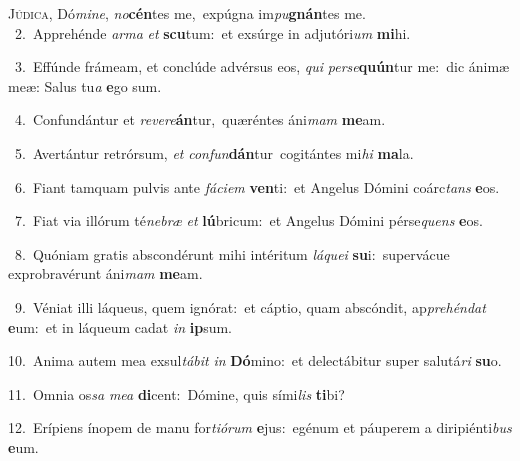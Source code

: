 \lettrine{\initial\textcolor{\initialcolor}{J}}{údica,} Dó\-\textit{mi}\-\textit{ne}, \textit{no}\-\textbf{cén}tes me,~\star expúgna im\-\textit{pu}\-\textbf{gnán}tes me.\\
{\numbfont\textcolor{\numbcolor}{~2.}}~Apprehénde \textit{ar}\-\textit{ma} \textit{et} \textbf{scu}\-tum:~\star et exsúrge in adjutóri\textit{um} \textbf{mi}\-hi.\par
{\numbfont\textcolor{\numbcolor}{~3.}}~Effúnde frámeam, et conclúde advérsus eos, \textit{qui} \textit{per}\-\textit{se}\textbf{quún}tur me:~\star dic ánimæ meæ: Salus tu\textit{a} \textbf{e}\-go sum.\par
{\numbfont\textcolor{\numbcolor}{~4.}}~Confundántur et \textit{re}\-\textit{ve}\textit{re}\textbf{án}tur,~\star quæréntes áni\textit{mam} \textbf{me}\-am.\par
{\numbfont\textcolor{\numbcolor}{~5.}}~Avertántur retrórsum, \textit{et} \textit{con}\-\textit{fun}\textbf{dán}tur~\star cogitántes mi\textit{hi} \textbf{ma}\-la.\par
{\numbfont\textcolor{\numbcolor}{~6.}}~Fiant tamquam pulvis ante \textit{fá}\-\textit{ci}\textit{em} \textbf{ven}\-ti:~\star et Angelus Dómini coárc\textit{tans} \textbf{e}\-os.\par
{\numbfont\textcolor{\numbcolor}{~7.}}~Fiat via illórum té\-\textit{ne}\-\textit{bræ} \textit{et} \textbf{lú}\-bricum:~\star et Angelus Dómini pérse\textit{quens} \textbf{e}\-os.\par
{\numbfont\textcolor{\numbcolor}{~8.}}~Quóniam gratis abscondérunt mihi intéritum \textit{lá}\-\textit{que}\textit{i} \textbf{su}\-i:~\star supervácue exprobravérunt áni\textit{mam} \textbf{me}\-am.\par
{\numbfont\textcolor{\numbcolor}{~9.}}~Véniat illi láqueus, quem ignórat:~\dagger et cáptio, quam abscóndit, ap\-\textit{pre}\-\textit{hén}\textit{dat} \textbf{e}\-um:~\star et in láqueum cadat \textit{in} \textbf{ip}\-sum.\par
{\numbfont\textcolor{\numbcolor}{10.}}~Anima autem mea exsul\-\textit{tá}\-\textit{bit} \textit{in} \textbf{Dó}\-mino:~\star et delectábitur super salutá\textit{ri} \textbf{su}\-o.\par
{\numbfont\textcolor{\numbcolor}{11.}}~Omnia os\textit{sa} \textit{me}\-\textit{a} \textbf{di}\-cent:~\star Dómine, quis sími\textit{lis} \textbf{ti}\-bi?\par
{\numbfont\textcolor{\numbcolor}{12.}}~Erípiens ínopem de manu for\-\textit{ti}\-\textit{ó}\textit{rum} \textbf{e}\-jus:~\star egénum et páuperem a diripiénti\textit{bus} \textbf{e}\-um.\par
